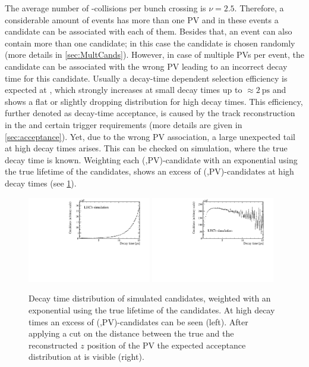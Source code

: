 The average number of \proton\proton-collisions per bunch crossing is $\nu=2.5$.
Therefore, a considerable amount of events has more than one \ac{PV} and in these events a \Bz candidate can be associated with each of them.
Besides that, an event can also contain more than one \Bz candidate; in this case the \Bz candidate is chosen randomly (more details in \cref{sec:MultCands}).
However, in case of multiple \ac{PV}s per event, the \Bz candidate can be associated with the wrong PV leading to an incorrect decay time for this candidate.
Usually a decay-time dependent selection efficiency is expected at \lhcb, which strongly increases at small decay times up to $\approx\SI{2}{\pico\second}$ and shows a flat or slightly dropping distribution for high decay times.
This efficiency, further denoted as decay-time acceptance, is caused by the track reconstruction in the \velo and certain trigger requirements (more details are given in \cref{sec:acceptance}).
Yet, due to the wrong \ac{PV} association, a large unexpected tail at high decay times arises.
This can be checked on simulation, where the true decay time is known.
Weighting each (\Bz,\ac{PV})-candidate with an exponential using the true lifetime of the \Bz candidates, shows an excess of (\Bz,\ac{PV})-candidates at high decay times (see \cref{fig:WrongPVMC}).
\begin{figure}[tbp]
    \centering
    \includegraphics[width=0.48\textwidth]{07selection/figs/WrongPVs-weightedBad.pdf}
    \includegraphics[width=0.48\textwidth]{07selection/figs/WrongPVs-weightedGoodMC.pdf}
    \caption{Decay time distribution of simulated \BdToDpi candidates, weighted with an exponential using the true lifetime of the \Bz candidates.
    At high decay times an excess of (\Bz,\ac{PV})-candidates can be seen (left).
    After applying a cut on the distance between the true and the reconstructed $z$ position of the \ac{PV} the expected acceptance distribution at \lhcb is visible (right).}
    \label{fig:WrongPVMC}
\end{figure}
